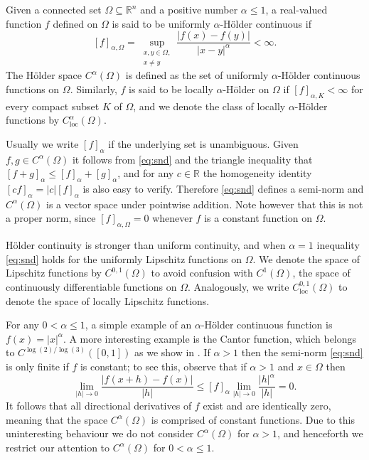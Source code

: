 \documentclass[oneside,hidelinks,indentfirst,10pt]{book}
\begin{document}
Given a connected set \(\Omega\subseteq\mathbb{R}^n\) and a positive number \(\alpha\leq 1\), a real-valued function \(f\) defined on \(\Omega\) is said to be uniformly \(\alpha\)-H\"older continuous if 
\begin{equation}\label{eq:snd}
    [f]_{\alpha,\Omega}=\sup_{\substack{x,y\in \Omega,\\x\neq y}}\frac{|f(x)-f(y)|}{|x-y|^\alpha}<\infty.
\end{equation}
The H\"older space \(C^\alpha(\Omega)\) is defined as the set of uniformly \(\alpha\)-H\"older continuous functions on \(\Omega\). Similarly, \(f\) is said to be locally \(\alpha\)-H\"older on \(\Omega\) if \([f]_{\alpha,K}<\infty\) for every compact subset \(K\) of \(\Omega\), and we denote the class of locally \(\alpha\)-H\"older functions by \(C^{\alpha}_\mathrm{loc}(\Omega)\).


Usually we write \([f]_\alpha\) if the underlying set is unambiguous. Given \(f,g\in C^\alpha(\Omega)\) it follows from \eqref{eq:snd} and the triangle inequality that \([f+g]_\alpha\leq [f]_\alpha+[g]_\alpha\), and for any \(c\in\mathbb{R}\) the homogeneity identity \([cf]_\alpha=|c|[f]_\alpha\) is also easy to verify. Therefore \eqref{eq:snd} defines a semi-norm and \(C^\alpha(\Omega)\) is a vector space under pointwise addition. Note however that this is not a proper norm, since \([f]_{\alpha,\Omega}=0\) whenever \(f\) is a constant function on \(\Omega\). 


H\"older continuity is stronger than uniform continuity, and when \(\alpha=1\) inequality \eqref{eq:snd} holds for the uniformly Lipschitz functions on \(\Omega\). We denote the space of Lipschitz functions by \(C^{0,1}(\Omega)\) to avoid confusion with \(C^1(\Omega)\), the space of continuously differentiable functions on \(\Omega\). Analogously, we write \(C^{0,1}_\mathrm{loc}(\Omega)\) to denote the space of locally Lipschitz functions.


For any \(0<\alpha\leq 1\), a simple example of an \(\alpha\)-H\"older continuous function is \(f(x)=|x|^\alpha\). A more interesting example is the Cantor function, which belongs to \(C^{\log(2)/\log(3)}([0,1])\) as we show in . If \(\alpha>1\) then the semi-norm \eqref{eq:snd} is only finite if \(f\) is constant; to see this, observe that if \(\alpha>1\) and \(x\in\Omega\) then
\[
    \lim_{|h|\rightarrow0}\frac{|f(x+h)-f(x)|}{|h|}\leq [f]_\alpha\lim_{|h|\rightarrow0}\frac{|h|^\alpha}{|h|}=0.
\]
It follows that all directional derivatives of \(f\) exist and are identically zero, meaning that the space \(C^\alpha(\Omega)\) is comprised of constant functions. Due to this uninteresting behaviour we do not consider \(C^\alpha(\Omega)\) for \(\alpha>1\), and henceforth we restrict our attention to \(C^\alpha(\Omega)\) for \(0<\alpha\leq 1\). 
\end{document}
